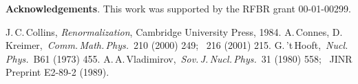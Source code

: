 \documentclass[a4paper,12pt]{article}
\begin{document}
\vspace{.5cm}

\noindent
{\small {\bf Acknowledgements}. This work was supported by the RFBR
grant 00-01-00299.}

\vspace{0cm}

\begin{thebibliography}{99}

 J.\,C.\,Collins, \emph{Renormalization}, Cambridge
University Press, 1984.
 A.\,Connes, D.\,Kreimer, \,\emph{Comm.\,Math.\,Phys.}\,
210 (2000) 249; \ 216 (2001) 215.
 G.\,'t\,Hooft, \,\emph{Nucl.\,Phys.}\, B61 (1973) 455.
 A.\,A.\,Vladimirov, \,\emph{Sov.\,J.\,Nucl.\,Phys.}\,
31 (1980) 558; \ JINR Preprint E2-89-2 (1989).

\end{thebibliography}
\end{document}
